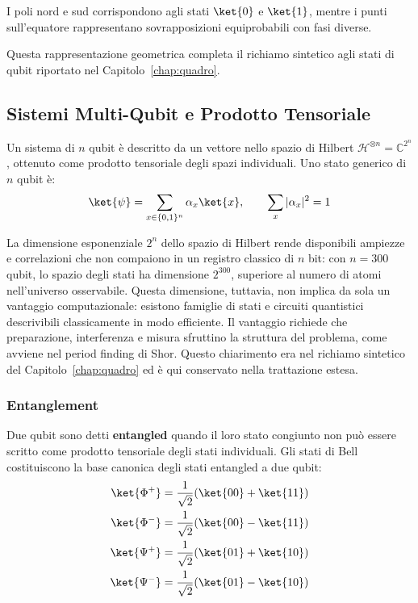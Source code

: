 \begin{onehalfspace}
I poli nord e sud corrispondono agli stati $\ket{0}$ e $\ket{1}$, mentre i punti sull'equatore rappresentano sovrapposizioni equiprobabili con fasi diverse.

Questa rappresentazione geometrica completa il richiamo sintetico agli stati
di qubit riportato nel Capitolo~\ref{chap:quadro}.

\subsection{Sistemi Multi-Qubit e Prodotto Tensoriale}

Un sistema di $n$ qubit è descritto da un vettore nello spazio di Hilbert $\mathcal{H}^{\otimes n} = \mathbb{C}^{2^n}$, ottenuto come prodotto tensoriale degli spazi individuali. Uno stato generico di $n$ qubit è:
\begin{equation}
    \ket{\psi} = \sum_{x \in \{0,1\}^n} \alpha_x \ket{x}, \qquad \sum_{x} |\alpha_x|^2 = 1
\end{equation}

La dimensione esponenziale $2^n$ dello spazio di Hilbert rende disponibili
ampiezze e correlazioni che non compaiono in un registro classico di $n$ bit:
con $n = 300$ qubit, lo spazio degli stati ha dimensione $2^{300}$, superiore
al numero di atomi nell'universo osservabile. Questa dimensione, tuttavia, non
implica da sola un vantaggio computazionale: esistono famiglie di stati e
circuiti quantistici descrivibili classicamente in modo efficiente. Il vantaggio
richiede che preparazione, interferenza e misura sfruttino la struttura del
problema, come avviene nel period finding di Shor. Questo chiarimento era nel
richiamo sintetico del Capitolo~\ref{chap:quadro} ed è qui conservato nella
trattazione estesa.

\subsubsection{Entanglement}

Due qubit sono detti \textbf{entangled} quando il loro stato congiunto non può essere scritto come prodotto tensoriale degli stati individuali. Gli stati di Bell costituiscono la base canonica degli stati entangled a due qubit:
\begin{align}
    \ket{\Phi^+} &= \frac{1}{\sqrt{2}}(\ket{00} + \ket{11}) \\
    \ket{\Phi^-} &= \frac{1}{\sqrt{2}}(\ket{00} - \ket{11}) \\
    \ket{\Psi^+} &= \frac{1}{\sqrt{2}}(\ket{01} + \ket{10}) \\
    \ket{\Psi^-} &= \frac{1}{\sqrt{2}}(\ket{01} - \ket{10})
\end{align}


\end{onehalfspace}
